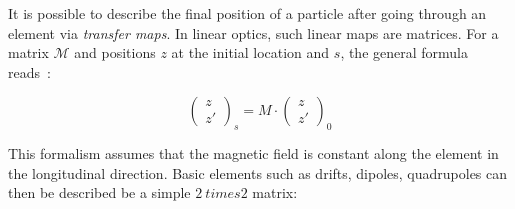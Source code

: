 \subsubsection{}

It is possible to describe the final position of a particle after going through an element via
\textit{transfer maps}. In linear optics, such linear maps are matrices. For a matrix $\mathcal{M}$
and positions $z$ at the initial location and $s$, the general formula
reads~\cite{lee_accelerator_2004}:

\begin{equation}
    \begin{pmatrix}
        z \\
        z'
    \end{pmatrix}_s
    = M \cdot 
    \begin{pmatrix}
        z \\
        z'
    \end{pmatrix}_0
\end{equation}

This formalism assumes that the magnetic field is constant along the element in the longitudinal
direction. Basic elements such as drifts, dipoles, quadrupoles can then be described be a simple
$2 \ times 2$ matrix:

